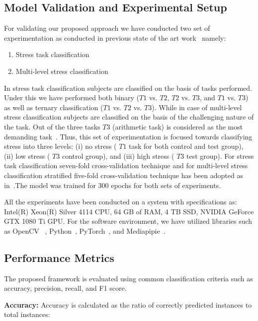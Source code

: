 \subsection{Model Validation and Experimental Setup } \label{validate}
For validating our proposed approach we have conducted two set of experimentation as conducted in previous state of the art work~\cite{ziaratnia2024multimodal} namely:
\begin{enumerate}
\item Stress task classification
\item Multi-level stress classification
\end{enumerate}
In stress task classification subjects are classified on the basis of tasks performed. Under this we have performed both binary ($T1$ vs. $T2$, $T2$ vs. $T3$, and $T1$ vs. $T3$) as well as ternary classification ($T1$ vs. $T2$ vs. $T3$). While in case of multi-level stress classification subjects are classified on the basis of the challenging nature of the task. Out of the three tasks $T3$ (arithmetic task)  is considered as the most demanding task~\cite{ziaratnia2024multimodal}. Thus, this set of experimentation is focused towards  classifying stress into three levels: (i) no stress ( $T1$ task for both control and test group), (ii) low stress ( $T3$ control group), and (iii) high stress ( $T3$ test group). For stress task classification seven-fold cross-validation technique and for multi-level stress classification stratified five-fold cross-validation technique has been adopted as in~\cite{ziaratnia2024multimodal}.The model was trained for 300 epochs for both sets of experiments.

All the experiments have  been conducted on a system with specifications as: Intel(R) Xeon(R) Silver 4114 CPU, 64 GB of RAM,  4 TB SSD,  NVIDIA GeForce GTX 1080 Ti GPU. For the software environment, we  have utilized  libraries such as 
 OpenCV ~\cite{mordvintsev2017opencv}, Python~\cite{de2012pattern}, PyTorch~\cite{imambi2021pytorch}, and Mediapipie~\cite{lugaresi2019mediapipe}.


\subsection{Performance Metrics}
The proposed framework is evaluated using common classification criteria such as accuracy, precision, recall, and F1 score.


\textbf{Accuracy:}
 Accuracy is calculated as the ratio of correctly predicted instances to total instances:

